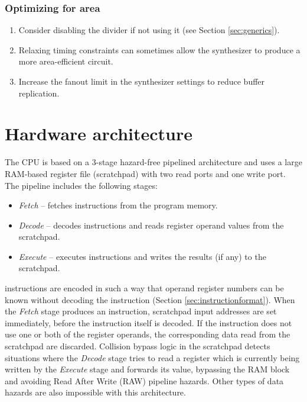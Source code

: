\documentclass[a4paper,12pt,twoside,extrafontsizes]{memoir}
\begin{document}
\subsection{Optimizing for area}

\begin{enumerate}
	\item Consider disabling the divider if not using it (see Section \ref{sec:generics}).
	
	\item Relaxing timing constraints can sometimes allow the synthesizer to produce a more area-efficient circuit.
	
	\item Increase the fanout limit in the synthesizer settings to reduce buffer replication.
\end{enumerate}

\chapter{Hardware architecture}
\label{ch:pipeline}

The \lxp{} CPU is based on a 3-stage hazard-free pipelined architecture and uses a large RAM-based register file (scratchpad) with two read ports and one write port. The pipeline includes the following stages:

\begin{itemize}
	\item\emph{Fetch} -- fetches instructions from the program memory.
	\item\emph{Decode} -- decodes instructions and reads register operand values from the scratchpad.
	\item\emph{Execute} -- executes instructions and writes the results (if any) to the scratchpad.
\end{itemize}

\lxp{} instructions are encoded in such a way that operand register numbers can be known without decoding the instruction (Section \ref{sec:instructionformat}). When the \emph{Fetch} stage produces an instruction, scratchpad input addresses are set immediately, before the instruction itself is decoded. If the instruction does not use one or both of the register operands, the corresponding data read from the scratchpad are discarded. Collision bypass logic in the scratchpad detects situations where the \emph{Decode} stage tries to read a register which is currently being written by the \emph{Execute} stage and forwards its value, bypassing the RAM block and avoiding Read After Write (RAW) pipeline hazards. Other types of data hazards are also impossible with this architecture.
\end{document}
